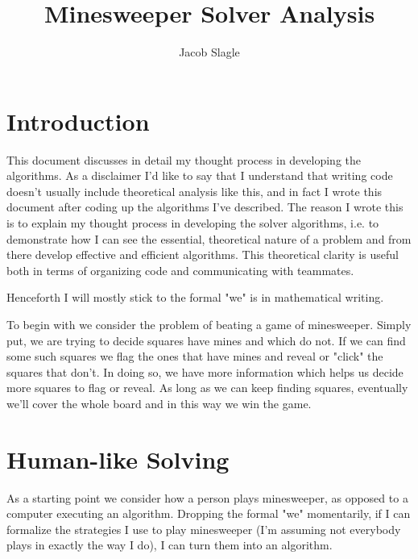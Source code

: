 \documentclass{article}
\title{Minesweeper Solver Analysis}
\author{Jacob Slagle}
\theoremstyle{definition}
\theoremstyle{definition}
\theoremstyle{theorem}
\begin{document}
	\maketitle
	
	\section*{Introduction}
	This document discusses in detail my thought process in developing the algorithms. As a disclaimer I'd like to say that I understand that writing code doesn't usually include theoretical analysis like this, and in fact I wrote this document after coding up the algorithms I've described. The reason I wrote this is to explain my thought process in developing the solver algorithms, i.e. to demonstrate how I can see the essential, theoretical nature of a problem and from there develop effective and efficient algorithms. This theoretical clarity is useful both in terms of organizing code and communicating with teammates.
	
	
	Henceforth I will mostly stick to the formal "we" is in mathematical writing.
	
	To begin with we consider the problem of beating a game of minesweeper. Simply put, we are trying to decide squares have mines and which do not. If we can find some such squares we flag the ones that have mines and reveal or "click" the squares that don't. In doing so, we have more information which helps us decide more squares to flag or reveal. As long as we can keep finding squares, eventually we'll cover the whole board and in this way we win the game.
	\section*{Human-like Solving}
	As a starting point we consider how a person plays minesweeper, as opposed to a computer executing an algorithm. Dropping the formal "we" momentarily, if I can formalize the strategies I use to play minesweeper (I'm assuming not everybody plays in exactly the way I  do), I can turn them into an algorithm.
	
\end{document}

